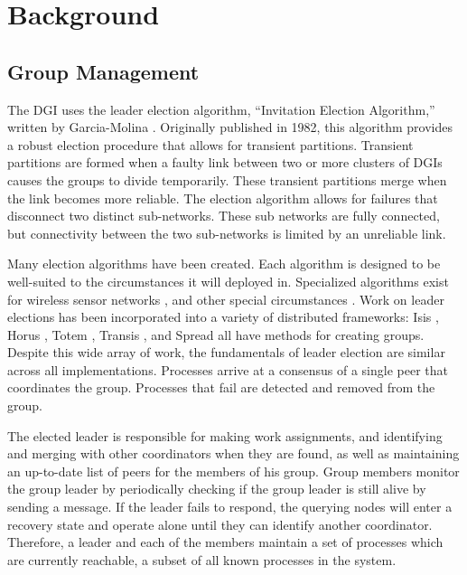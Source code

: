 \section{Background}

\subsection{Group Management}

The DGI uses the leader election algorithm, ``Invitation Election Algorithm,'' written by Garcia-Molina \cite{INVITATIONELECTION}.
Originally published in 1982, this algorithm provides a robust election  procedure that allows for transient partitions.
Transient partitions are formed when a faulty link between two or more clusters of DGIs causes the groups to divide temporarily.
These transient partitions merge when the link becomes more reliable.
The election algorithm allows for failures that disconnect two distinct sub-networks.
These sub networks are fully connected, but connectivity between the two sub-networks is limited by an unreliable link.

Many election algorithms have been created. 
Each algorithm is designed to be well-suited to the circumstances it will deployed in.
Specialized algorithms exist for wireless sensor networks \cite{LE-WSN-1}\cite{LE-WSN-2}, and other special circumstances \cite{LE-SPECIALCIRCUMSTANCES-1}\cite{LE-SPECIALCIRCUMSTANCES-2}.
Work on leader elections has been incorporated into a variety of distributed frameworks: Isis \cite{ISISTOOLKIT}, Horus \cite{HORUSTOOLKIT}, Totem \cite{TOTEMTOOLKIT}, Transis \cite{TRANSISTOOLKIT}, and Spread \cite{SPREADTOOLKIT} all have methods for creating groups.
Despite this wide array of work, the fundamentals of leader election are similar across all implementations.
Processes arrive at a consensus of a single peer that coordinates the group.
Processes that fail are detected and removed from the group. 

The elected leader is responsible for making work assignments, and identifying and merging with other coordinators when they are found, as well as maintaining an up-to-date list of peers for the members of his group. 
Group members monitor the group leader by periodically checking if the group leader is still alive by sending a message. 
If the leader fails to respond, the querying nodes will enter a recovery state and operate alone until
they can identify another coordinator.
Therefore, a leader and each of the members maintain a set of processes which are currently reachable, a subset of all known processes in the system.

